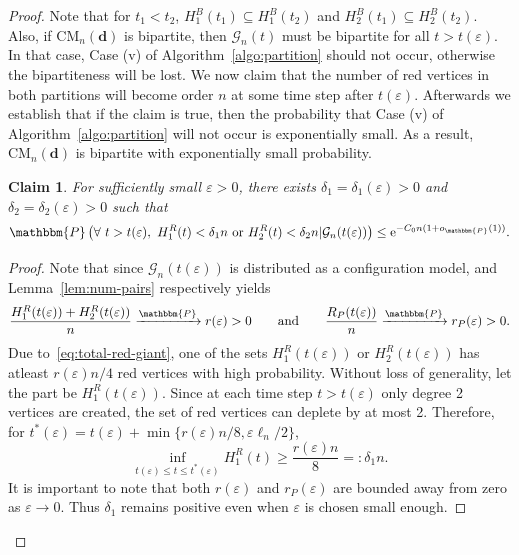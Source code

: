 \documentclass[11pt,a4paper, reqno]{article}
\numberwithin{equation}{section}
\numberwithin{equation}{section}
\def\sss{\scriptscriptstyle}
\newcommand{\prob}[1]{\ensuremath{\mathbbm{P}\left(#1\right)}}
\newcommand{\pto}{\ensuremath{\xrightarrow{\mathbbm{P}}}}
\newcommand{\PR}{\ensuremath{\mathbbm{P}}}
\newcommand{\e}{\ensuremath{\mathrm{e}}}
\newcommand{\1}{\ensuremath{\mathbbm{1}}}
\newcommand{\oP}{\ensuremath{o_{\sss\PR}}}
\newcommand{\CM}{\ensuremath{\mathrm{CM}_n(\boldsymbol{d})}}
\newcommand{\cG}{\mathcal{G}}
\newtheorem{claim}{Claim}
\newenvironment{claimproof}{\begin{proof}\renewcommand{\qedsymbol}{\claimqed}}{\end{proof}\renewcommand{\qedsymbol}{\plainqed}}
\let\plainqed\qedsymbol
\newcommand{\claimqed}{$\lrcorner$}
\numberwithin{equation}{section}
\numberwithin{theorem}{section}
\begin{document}
\begin{proof}
\noindent
Note that for $t_1<t_2$, $H_1^B(t_1)\subseteq H_1^B(t_2)$ and $H_2^B(t_1)\subseteq H_2^B(t_2)$.
Also, if $\CM$ is bipartite, then $\cG_n(t)$ must be bipartite for all $t>t(\varepsilon)$.
In that case, Case (v) of Algorithm~\ref{algo:partition} should not occur, otherwise the bipartiteness will be lost. 
We now claim that the number of red vertices in both partitions will become order $n$ at some time step after $t(\varepsilon)$.
Afterwards we establish that if the claim is true, then the probability that
Case (v) of Algorithm~\ref{algo:partition} will not occur is exponentially small.
As a result, $\CM$ is bipartite with exponentially small probability.
\begin{claim}\label{claim:good-cut}
For sufficiently small $\varepsilon>0$, there exists $\delta_1=\delta_1(\varepsilon)>0$ and $\delta_2=\delta_2(\varepsilon)>0$ such that
\begin{equation}
\prob{\forall\ t>t(\varepsilon),\ H_1^R(t)<\delta_1n\  \mbox{\rm or }H_2^R(t)<\delta_2n\vert\mathcal{G}_n(t(\varepsilon))} \leq \e^{-C_0n (1+\oP(1))}.
\end{equation}
\end{claim}
\begin{claimproof}
Note that since $\mathcal{G}_n(t(\varepsilon))$ is distributed as a configuration model,  \cite[Theorem~2.3~(i)]{JL09} and Lemma~\ref{lem:num-pairs} respectively yields
\begin{equation}\label{eq:total-red-giant}
\frac{H_1^R(t(\varepsilon))+H_2^R(t(\varepsilon))}{n} \pto r(\varepsilon)>0\qquad\mathrm{and}\qquad \frac{R_P(t(\varepsilon))}{n}\pto r_P(\varepsilon)>0.
\end{equation}
Due to~\eqref{eq:total-red-giant}, one of the sets $H_1^R(t(\varepsilon))$ or $H_2^R(t(\varepsilon))$ has atleast $r(\varepsilon) n/4$ red vertices with high probability.
Without loss of generality, let the part be $H_1^R(t(\varepsilon))$.
Since at each time step $t> t(\varepsilon)$ only degree 2 vertices are created, the set of red vertices can deplete by at most 2. 
Therefore, for $t^*(\varepsilon) = t(\varepsilon)+\min\{r(\varepsilon) n/8,\varepsilon\ell_n/2\}$, 
\begin{equation}\label{eq:delta1up}
\inf_{t(\varepsilon)\leq t\leq t^*(\varepsilon)} H^R_1(t)\geq\frac{r(\varepsilon)n}{8}=:\delta_1n.
\end{equation}
It is important to note that both $r(\varepsilon)$ and $r_P(\varepsilon)$ are bounded away from zero as $\varepsilon\to 0$. Thus $\delta_1$ remains positive even when $\varepsilon$ is chosen small enough.

\end{claimproof}
\end{proof}
\end{document}
